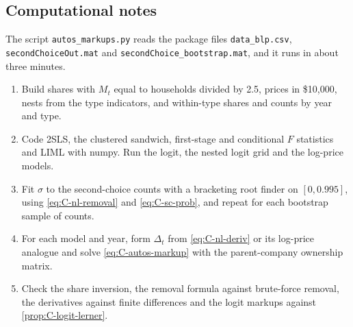 \subsection{Computational notes}

The script \texttt{autos\_markups.py} reads the package files \texttt{data\_blp.csv}, \texttt{secondChoiceOut.mat}
and \texttt{secondChoice\_bootstrap.mat}, and it runs in about three minutes.
\begin{enumerate}
  \item Build shares with $M_t$ equal to households divided by 2.5, prices in \$10,000, nests from the type indicators,
  and within-type shares and counts by year and type.
  \item Code 2SLS, the clustered sandwich, first-stage and conditional $F$ statistics and LIML with numpy. Run the
  logit, the nested logit grid and the log-price models.
  \item Fit $\sigma$ to the second-choice counts with a bracketing root finder on $[0, 0.995]$, using
  \eqref{eq:C-nl-removal} and \eqref{eq:C-sc-prob}, and repeat for each bootstrap sample of counts.
  \item For each model and year, form $\Delta_t$ from \eqref{eq:C-nl-deriv} or its log-price analogue and solve
  \eqref{eq:C-autos-markup} with the parent-company ownership matrix.
  \item Check the share inversion, the removal formula against brute-force removal, the derivatives against finite
  differences and the logit markups against \cref{prop:C-logit-lerner}.
\end{enumerate}
